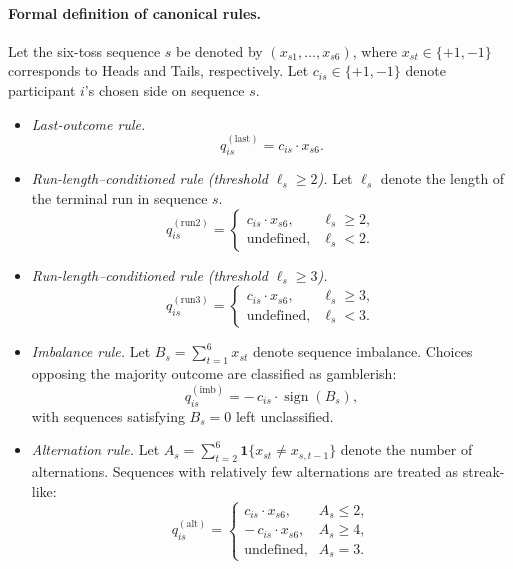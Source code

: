 \documentclass[11pt,a4paper]{article}
\numberwithin{equation}{section}
\begin{document}
\paragraph{Formal definition of canonical rules.}
Let the six-toss sequence $s$ be denoted by $(x_{s1},\dots,x_{s6})$, where
$x_{st}\in\{+1,-1\}$ corresponds to Heads and Tails, respectively.
Let $c_{is}\in\{+1,-1\}$ denote participant $i$’s chosen side on sequence $s$.

\begin{itemize}
	\item \textit{Last-outcome rule.}
	\[
	q^{(\mathrm{last})}_{is} = c_{is}\cdot x_{s6}.
	\]
	
	\item \textit{Run-length–conditioned rule (threshold $\ell_s \ge 2$).}
	Let $\ell_s$ denote the length of the terminal run in sequence $s$.
	\[
	q^{(\mathrm{run2})}_{is} =
	\begin{cases}
		c_{is}\cdot x_{s6}, & \ell_s \ge 2,\\
		\text{undefined}, & \ell_s < 2.
	\end{cases}
	\]
	
	\item \textit{Run-length–conditioned rule (threshold $\ell_s \ge 3$).}
	\[
	q^{(\mathrm{run3})}_{is} =
	\begin{cases}
		c_{is}\cdot x_{s6}, & \ell_s \ge 3,\\
		\text{undefined}, & \ell_s < 3.
	\end{cases}
	\]
	
	\item \textit{Imbalance rule.}
	Let $B_s=\sum_{t=1}^6 x_{st}$ denote sequence imbalance.
	Choices opposing the majority outcome are classified as gamblerish:
	\[
	q^{(\mathrm{imb})}_{is} = -\,c_{is}\cdot \operatorname{sign}(B_s),
	\]
	with sequences satisfying $B_s=0$ left unclassified.
	
	\item \textit{Alternation rule.}
	Let $A_s=\sum_{t=2}^6 \mathbf{1}\{x_{st}\neq x_{s,t-1}\}$ denote the number of
	alternations.
	Sequences with relatively few alternations are treated as streak-like:
	\[
	q^{(\mathrm{alt})}_{is} =
	\begin{cases}
		c_{is}\cdot x_{s6}, & A_s \le 2,\\
		-\,c_{is}\cdot x_{s6}, & A_s \ge 4,\\
		\text{undefined}, & A_s = 3.
	\end{cases}
	\]
\end{itemize}
\end{document}
